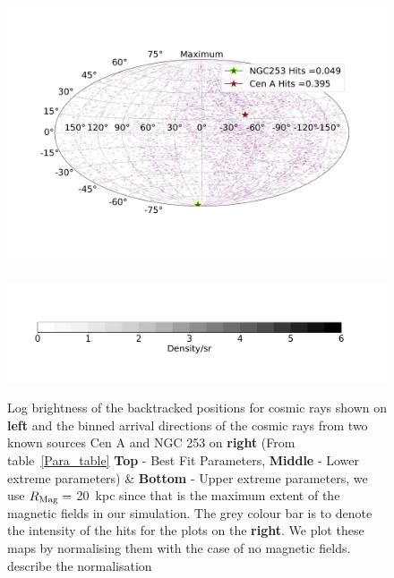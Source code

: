 \documentclass[usenatbib]{mnras}
\newcommand{\Vasu}[1]{{\color{purple}#1}}
\begin{document}
\begin{figure}
\includegraphics[width=0.49\linewidth]{Images/Bins_180_UB_N2_CenA_NGC253_Str_Tur_TM_40_EeV.png}\
\hspace*{+9cm}                                      \includegraphics[width=0.50\linewidth]{Images/Colorbar.png}
\caption{Log brightness of the backtracked positions for cosmic rays shown on \textbf{left} and the binned arrival directions of the cosmic rays from two known sources Cen A and NGC 253 on \textbf{right} (From table~\ref{Para_table} \textbf{Top} - Best Fit Parameters, {\textbf{Middle} - Lower extreme parameters)} \& {\textbf{Bottom} - Upper extreme parameters, we use $R_{\rm Mag} = $ 20~kpc since that is the maximum extent of the magnetic fields in our simulation. The grey colour bar is to denote the intensity of the hits for the plots on the \textbf{right}. We  plot these maps by normalising them with the case of no magnetic fields.}
\Vasu{describe the normalisation}}
\label{fig:AD_Plots}
\end{figure}

\end{document}
